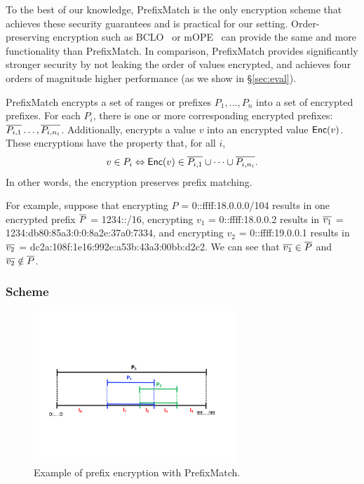  To the best of our knowledge, PrefixMatch is the only encryption scheme that achieves these security guarantees and is practical for our setting.
 Order-preserving encryption such as BCLO~\cite{boldyreva:ope} or mOPE~\cite{popa:mope} can provide the same and more functionality than PrefixMatch. In comparison, PrefixMatch provides significantly stronger security by not leaking the order of values encrypted, and achieves four orders of magnitude higher performance  (as we show in \S\ref{sec:eval}).






PrefixMatch encrypts a set of ranges or prefixes $P_1, \dots, P_n$ into a set of encrypted prefixes. For each $P_i$, there is one or more corresponding encrypted prefixes: $\overline{P_{i,1}} \dots, \overline{P_{i, n_i}}$.  Additionally, \pmatch{} encrypts a value $v$ into an encrypted value $\mathsf{Enc}(v)$. These encryptions have the  property that, for all $i$,  
%
\[  v \in P_i  \Leftrightarrow \mathsf{Enc}(v) \in \overline{P_{i, 1}} \cup \dots \cup \overline{P_{i, n_i}}. \]
%
In other words, the encryption preserves prefix matching.



For example, suppose that encrypting $P$ =  0::ffff:18.0.0.0/104 results in one encrypted prefix $\overline{P}$ = 1234::/16, encrypting $v_1$ = 0::ffff:18.0.0.2 results in  
 $\overline{v_1}$ = 1234:db80:85a3:0:0:8a2e:37a0:7334, and encrypting $v_2$ = 0::ffff:19.0.0.1 results in 
$\overline{v_2}$ = dc2a:108f:1e16:992e:a53b:43a3:00bb:d2c2. We can see that $\overline{v_1} \in \overline{P}$ and $\overline{v_2} \notin \overline{P}$. 




\subsubsection{Scheme} 
\label{sec:rmscheme}

\begin{figure}[t]
  \centering
  \includegraphics[width=3in]{fig/rangeopts3.pdf}
  \caption[]{Example of prefix encryption with PrefixMatch.\label{fig:rangeopts3}}
\end{figure}

